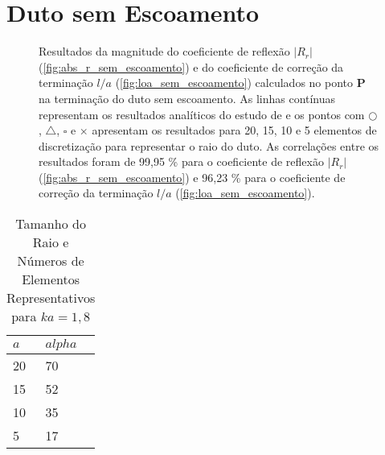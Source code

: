 \section{Duto sem Escoamento}

\begin{figure}[ht!]
\begin{subfigure}{\scaleA \textwidth}
  
\end{subfigure}%
\begin{subfigure}{\scaleA \textwidth}
  
\end{subfigure}
\caption[Resultados de $|R_{r}|$ e $l/a$ sem escoamento]{Resultados da magnitude do coeficiente de reflexão $|R_{r}|$ (\ref{fig:abs_r_sem_escoamento}) e do coeficiente de correção da terminação $l/a$ (\ref{fig:loa_sem_escoamento}) calculados no ponto $\textbf{P}$ na terminação do duto sem escoamento. As linhas contínuas representam os resultados analíticos do estudo de  e os pontos com $\bigcirc$, $\bigtriangleup$, $\square$ e $\times$ apresentam os resultados para 20, 15, 10 e 5 elementos de discretização para representar o raio do duto. As correlações entre os resultados foram de 99,95 \% para o coeficiente de reflexão $|R_{r}|$ (\ref{fig:abs_r_sem_escoamento}) e 96,23 \% para o coeficiente de correção da terminação $l/a$ (\ref{fig:loa_sem_escoamento}).}
\label{fig:resultados_sem_escoamento}
\end{figure}

\begin{table}[ht!]
\centering
\caption{Tamanho do Raio e Números de Elementos Representativos para $ka = 1,8$}
\label{table:modelos}
    \begin{tabular}{|l|l|}
        \hline
        $a$ & $alpha$ \\ \hline
        20  & 70      \\ \hline
        15  & 52      \\ \hline
        10  & 35      \\ \hline
        5   & 17      \\
        \hline
    \end{tabular}
\end{table}







